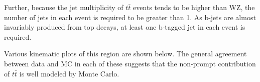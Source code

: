 Further, because the jet multiplicity of $t\bar{t}$ events tends to be higher than WZ, the number of jets in each event is required to be greater than 1. As b-jets are almost invariably produced from top decays, at least one b-tagged jet in each event is required. 



Various kinematic plots of this region are shown below. The general agreement between data and MC in each of these suggests that the non-prompt contribution of $t\bar{t}$ is well modeled by Monte Carlo.

